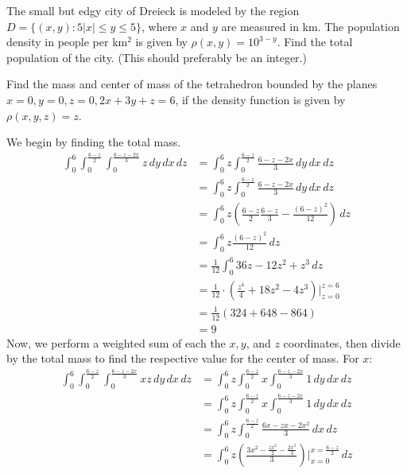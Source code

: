 \documentclass[12pt]{exam}
\begin{document}
\begin{questions}
\begin{solution}
    \end{solution}

\question  The small but edgy city of Dreieck is modeled by the region $D = \{ (x, y) : 5 |x| \leq y \leq 5\}$, where $x$ and $y$ are measured in km. The population density in people per km$^2$ is given by $\rho(x, y) = 10^{3-y}$. Find the total population of the city. (This should preferably be an integer.)

\question  Find the mass and center of mass of the tetrahedron bounded by the planes $x = 0, y = 0, z = 0,
2x + 3y + z = 6$, if the density function is given by $\rho(x, y, z) = z$.
    \begin{solution}
        We begin by finding the total mass.
        \begin{align*}
            \int_{0}^{6}\int_{0}^{\frac{6 - z}{2}}\int_{0}^{\frac{6 - z - 2x}{3}} z\, dy\, dx\, dz &= \int_{0}^{6}z\int_{0}^{\frac{6 - z}{2}}\frac{6 - z - 2x}{3} \, dy\, dx\, dz\\
            &= \int_{0}^{6}z\int_{0}^{\frac{6 - z}{2}} \frac{6 - z - 2x}{3}\, dy\, dx\, dz \\
            &= \int_{0}^{6} z\left(\frac{6 - z}{2} \frac{6 - z}{3} - \frac{(6 - z)^2}{12}\right)\, dz \\
            &= \int_{0}^{6}z \frac{(6 - z)^2}{12} \, dz \\
            &= \frac{1}{12}\int_{0}^{6} 36z - 12z^2 + z^3 \, dz \\
            &= \frac{1}{12} \cdot \left(\frac{z^4}{4} + 18z^2 - 4z^3  \right)|_{z=0}^{z=6} \\
            &= \frac{1}{12}(324 + 648 - 864) \\
            &= \boxed{9}
        \end{align*}
        Now, we perform a weighted sum of each the $x, y$, and $z$ coordinates, then divide by the total mass to find the respective value for the center of mass.
        For $x$:
        \begin{align*}
            \int_{0}^{6}\int_{0}^{\frac{6 - z}{2}}\int_{0}^{\frac{6 - z - 2x}{3}} xz\, dy\, dx\, dz &= \int_{0}^{6}z\int_{0}^{\frac{6 - z}{2}}x\int_{0}^{\frac{6 - z - 2x}{3}} 1 \, dy\, dx\, dz \\ 
            &= \int_{0}^{6}z\int_{0}^{\frac{6 - z}{2}}x\int_{0}^{\frac{6 - z - 2x}{3}} 1 \, dy \, dx\, dz \\
            &= \int_{0}^{6}z \int_{0}^{\frac{6 - z}{2}}\frac{6x - zx - 2x^2}{3} \, dx\, dz \\
            &= \int_{0}^{6}z \left(\frac{3x^2 - \frac{zx^2}{2} - \frac{2x^3}{3}}{3}\right)|_{x=0}^{x = \frac{6 - z}{2}} \, dz \\

\end{align*}
\end{solution}
\end{questions}
\end{document}
